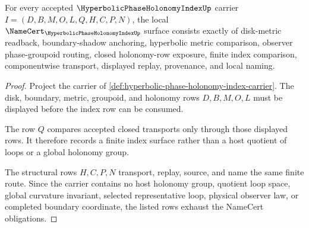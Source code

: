 \begin{theorem}
\label{thm:hyperbolic-phase-holonomy-index-namecert-obligations}
For every accepted $\HyperbolicPhaseHolonomyIndexUp$ carrier $I=(D,B,M,O,L,Q,H,C,P,N)$, the local $\NameCert_{\HyperbolicPhaseHolonomyIndexUp}$ surface consists exactly of disk-metric readback, boundary-shadow anchoring, hyperbolic metric comparison, observer phase-groupoid routing, closed holonomy-row exposure, finite index comparison, componentwise transport, displayed replay, provenance, and local naming.
\end{theorem}
\begin{proof}
Project the carrier of \autoref{def:hyperbolic-phase-holonomy-index-carrier}. The disk, boundary, metric, groupoid, and holonomy rows $D,B,M,O,L$ must be displayed before the index row can be consumed.

The row $Q$ compares accepted closed transports only through those displayed rows. It therefore records a finite index surface rather than a host quotient of loops or a global holonomy group.

The structural rows $H,C,P,N$ transport, replay, source, and name the same finite route. Since the carrier contains no host holonomy group, quotient loop space, global curvature invariant, selected representative loop, physical observer law, or completed boundary coordinate, the listed rows exhaust the NameCert obligations.
\end{proof}

